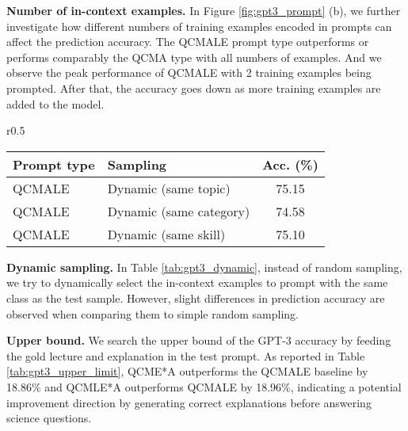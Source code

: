 \textbf{Number of in-context examples.} In Figure \ref{fig:gpt3_prompt} (b), we further investigate how different numbers of training examples encoded in prompts can affect the prediction accuracy. The QCMALE prompt type outperforms or performs comparably the QCMA type with all numbers of examples. And we observe the peak performance of QCMALE with 2 training examples being prompted. After that, the accuracy goes down as more training examples are added to the model.


\begin{wraptable}{r}{0.5\textwidth}
\vspace{-3.5mm}
\centering
\fontsize{8.5pt}{\baselineskip}\selectfont \renewcommand\tabcolsep{3.0pt} \renewcommand\arraystretch{1.0} \begin{tabular}{llc} 
\hline
\textbf{Prompt type} & \textbf{Sampling} & \textbf{Acc. (\%)}  \\ 
\hline
QCMALE & Dynamic (same topic) & 75.15  \\
QCMALE & Dynamic (same category) & 74.58 \\
QCMALE & Dynamic (same skill) & 75.10  \\
\hline
\end{tabular}
\vspace{-1mm}
\caption{Dynamic sampling for GPT-3 (CoT).}
\vspace{-6mm}
\label{tab:gpt3_dynamic}
\end{wraptable}

\textbf{Dynamic sampling.} In Table \ref{tab:gpt3_dynamic}, instead of random sampling, we try to dynamically select the in-context examples to prompt with the same class as the test sample. However, slight differences in prediction accuracy are observed when comparing them to simple random sampling.

\textbf{Upper bound.} We search the upper bound of the GPT-3 accuracy by feeding the gold lecture and explanation in the test prompt. 
As reported in Table \ref{tab:gpt3_upper_limit}, QCME*A outperforms the QCMALE baseline by 18.86\% and QCMLE*A outperforms QCMALE by 18.96\%, indicating a potential improvement direction by generating correct explanations before answering science questions.


